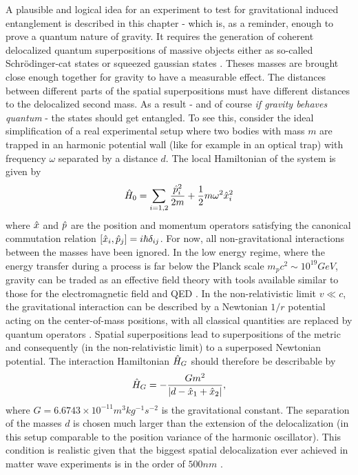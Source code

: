 A plausible and logical idea for an experiment to test for gravitational induced entanglement is described in this chapter - which is, as a reminder, enough to prove a quantum nature of gravity.
It requires the generation of coherent delocalized quantum superpositions of massive objects either as so-called Schrödinger-cat states or squeezed gaussian states \cite{Bose_2017, Pedernales_2023}. Theses masses are brought close enough together for gravity to have a measurable effect. The distances between different parts of the spatial superpositions must have different distances to the delocalized second mass. As a result - and of course \textit{if gravity behaves quantum} - the states should get entangled.
To see this, consider the ideal simplification of a real experimental setup where two bodies with mass $m$ are trapped in an harmonic potential wall (like for example in an optical trap) with frequency $\omega$ separated by a distance $d$. The local Hamiltonian of the system is given by
\begin{equation}
  \hat{H}_0 = \sum_{i = 1,2} \frac{\hat{p}_i^2}{2m} + \frac{1}{2}m\omega^2\hat{x}^2_i
\end{equation}
where $\hat{x}$ and $\hat{p}$ are the position and momentum operators satisfying the canonical commutation relation $[\hat{x}_i, \hat{p}_j] = i\hbar \delta_{ij}$.
For now, all non-gravitational interactions between the masses have been ignored. 
In the low energy regime, where the energy transfer during a process is far below the Planck scale $m_p c^2 \sim 10^{19}\si{GeV}$, gravity can be traded as an effective field theory with tools available similar to those for the electromagnetic field and QED \cite{Carney_2018}. 
In the non-relativistic limit $v \ll c$, the gravitational interaction can be described by a Newtonian $1/r$ potential acting on the center-of-mass positions, with all classical quantities are replaced by quantum operators \cite{Carney_2018,Pedernales_2023,Christodoulou_2022}. 
Spatial superpositions lead to superpositions of the metric and consequently (in the non-relativistic limit) to a superposed Newtonian potential.
The interaction Hamiltonian $\hat{H}_G$ should therefore be describable by
\begin{equation}\label{eq:2:gravity-hamiltonian}
  \hat{H}_G = - \frac{Gm^2}{\left\lvert d - \hat{x}_1 + \hat{x}_2\right\rvert} ,
\end{equation}
where $G=6.6743 \times 10^{-11} \si{m^3 kg^{-1} s^{-2}}$ is the gravitational constant. The separation of the masses $d$ is chosen much larger than the extension of the delocalization (in this setup comparable to the position variance of the harmonic oscillator). This condition is realistic given that the biggest spatial delocalization ever achieved in matter wave experiments is in the order of $500\si{nm}$ \cite{Fein_2019}.
